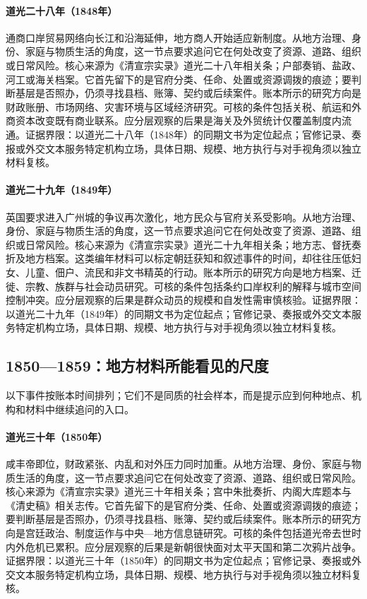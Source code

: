 \hypertarget{social:EQ-1848-YANGTZE-TRADE}{}\paragraph{道光二十八年（1848年）}通商口岸贸易网络向长江和沿海延伸，地方商人开始适应新制度。从地方治理、身份、家庭与物质生活的角度，这一节点要求追问它在何处改变了资源、道路、组织或日常风险。核心来源为《清宣宗实录》道光二十八年相关条；户部奏销、盐政、河工或海关档案。它首先留下的是官府分类、任命、处置或资源调拨的痕迹；要判断基层是否照办，仍须寻找县档、账簿、契约或后续案件。账本所示的研究方向是财政账册、市场网络、灾害环境与区域经济研究。可核的条件包括关税、航运和外商资本改变既有商业联系。应分层观察的后果是海关及外贸统计仅覆盖制度内流通。证据界限：以道光二十八年（1848年）的同期文书为定位起点；官修记录、奏报或外交文本服务特定机构立场，具体日期、规模、地方执行与对手视角须以独立材料复核。
\hypertarget{social:EQ-1849-GUANGZHOU-CITY-ENTRY}{}\paragraph{道光二十九年（1849年）}英国要求进入广州城的争议再次激化，地方民众与官府关系受影响。从地方治理、身份、家庭与物质生活的角度，这一节点要求追问它在何处改变了资源、道路、组织或日常风险。核心来源为《清宣宗实录》道光二十九年相关条；地方志、督抚奏折及地方档案。这类编年材料可以标定朝廷获知和叙述事件的时间，却往往压低妇女、儿童、佃户、流民和非文书精英的行动。账本所示的研究方向是地方档案、迁徙、宗教、族群与社会动员研究。可核的条件包括条约口岸权利的解释与城市空间控制冲突。应分层观察的后果是群众动员的规模和自发性需审慎核验。证据界限：以道光二十九年（1849年）的同期文书为定位起点；官修记录、奏报或外交文本服务特定机构立场，具体日期、规模、地方执行与对手视角须以独立材料复核。
\subsection{1850—1859：地方材料所能看见的尺度}
以下事件按账本时间排列；它们不是同质的社会样本，而是提示应到何种地点、机构和材料中继续追问的入口。
\hypertarget{social:EQ-1850-XIANFENG-ACCESSION}{}\paragraph{道光三十年（1850年）}咸丰帝即位，财政紧张、内乱和对外压力同时加重。从地方治理、身份、家庭与物质生活的角度，这一节点要求追问它在何处改变了资源、道路、组织或日常风险。核心来源为《清宣宗实录》道光三十年相关条；宫中朱批奏折、内阁大库题本与《清史稿》相关志传。它首先留下的是官府分类、任命、处置或资源调拨的痕迹；要判断基层是否照办，仍须寻找县档、账簿、契约或后续案件。账本所示的研究方向是宫廷政治、制度运作与中央—地方信息链研究。可核的条件包括道光帝去世时内外危机已累积。应分层观察的后果是新朝很快面对太平天国和第二次鸦片战争。证据界限：以道光三十年（1850年）的同期文书为定位起点；官修记录、奏报或外交文本服务特定机构立场，具体日期、规模、地方执行与对手视角须以独立材料复核。

